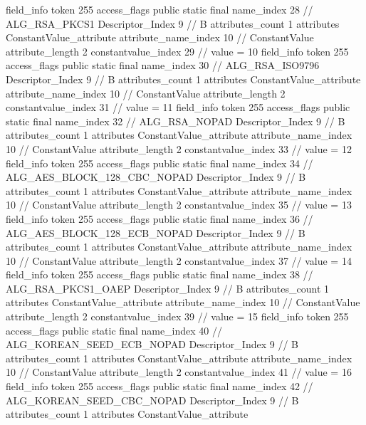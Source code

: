 {{{{{{{				}
				}
			}
			field_info {
				token	255
				access_flags	public static final
				name_index	28		// ALG_RSA_PKCS1
				Descriptor_Index	9		// B
				attributes_count	1
				attributes {
				ConstantValue_attribute {
					attribute_name_index	10		// ConstantValue
					attribute_length	2
					constantvalue_index	29		// value = 10
				}
				}
			}
			field_info {
				token	255
				access_flags	public static final
				name_index	30		// ALG_RSA_ISO9796
				Descriptor_Index	9		// B
				attributes_count	1
				attributes {
				ConstantValue_attribute {
					attribute_name_index	10		// ConstantValue
					attribute_length	2
					constantvalue_index	31		// value = 11
				}
				}
			}
			field_info {
				token	255
				access_flags	public static final
				name_index	32		// ALG_RSA_NOPAD
				Descriptor_Index	9		// B
				attributes_count	1
				attributes {
				ConstantValue_attribute {
					attribute_name_index	10		// ConstantValue
					attribute_length	2
					constantvalue_index	33		// value = 12
				}
				}
			}
			field_info {
				token	255
				access_flags	public static final
				name_index	34		// ALG_AES_BLOCK_128_CBC_NOPAD
				Descriptor_Index	9		// B
				attributes_count	1
				attributes {
				ConstantValue_attribute {
					attribute_name_index	10		// ConstantValue
					attribute_length	2
					constantvalue_index	35		// value = 13
				}
				}
			}
			field_info {
				token	255
				access_flags	public static final
				name_index	36		// ALG_AES_BLOCK_128_ECB_NOPAD
				Descriptor_Index	9		// B
				attributes_count	1
				attributes {
				ConstantValue_attribute {
					attribute_name_index	10		// ConstantValue
					attribute_length	2
					constantvalue_index	37		// value = 14
				}
				}
			}
			field_info {
				token	255
				access_flags	public static final
				name_index	38		// ALG_RSA_PKCS1_OAEP
				Descriptor_Index	9		// B
				attributes_count	1
				attributes {
				ConstantValue_attribute {
					attribute_name_index	10		// ConstantValue
					attribute_length	2
					constantvalue_index	39		// value = 15
				}
				}
			}
			field_info {
				token	255
				access_flags	public static final
				name_index	40		// ALG_KOREAN_SEED_ECB_NOPAD
				Descriptor_Index	9		// B
				attributes_count	1
				attributes {
				ConstantValue_attribute {
					attribute_name_index	10		// ConstantValue
					attribute_length	2
					constantvalue_index	41		// value = 16
				}
				}
			}
			field_info {
				token	255
				access_flags	public static final
				name_index	42		// ALG_KOREAN_SEED_CBC_NOPAD
				Descriptor_Index	9		// B
				attributes_count	1
				attributes {
				ConstantValue_attribute {
}}}}}}}
